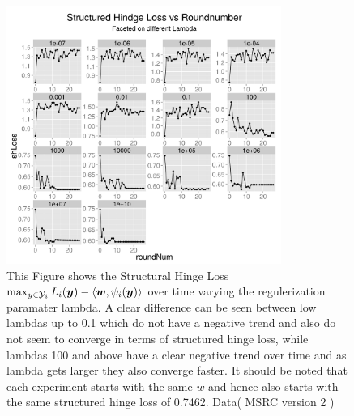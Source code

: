 \begin{figure}
  \centering
  \includegraphics[width=0.8\textwidth]{images/structuredHindgeLoss_vs_lambda_per_Round_msrc_subset.png}
  \caption{This Figure shows the Structural Hinge Loss $\max_{y \in \mathcal{Y}_i} L_i(\bm{y})-\langle \bm{w}, \psi_i(\bm{y}) \rangle$ over time varying the regulerization paramater lambda.  A clear difference can be seen between low lambdas up to 0.1 which do not have a negative trend and also do not seem to converge in terms of structured hinge loss, while lambdas 100 and above have a clear negative trend over time and as lambda gets larger they also converge faster. It should be noted that each experiment starts with the same $w$ and hence also starts with the same structured hinge loss of 0.7462. Data( MSRC version 2 \cite{msrcDataSet}) 	 } 
  \label{fig:lambda2}
\end{figure} 

